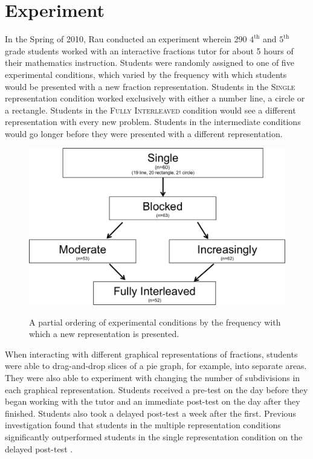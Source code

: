 \documentclass{edm_template}
\newcommand{\mgr}[1]{\textsc{#1}}
\begin{document}
\section{Experiment}
\label{sec:experiment}

In the Spring of 2010, Rau conducted an experiment wherein 290 $4^\text{th}$ and $5^\text{th}$ grade students worked with an interactive fractions tutor for about 5 hours of their mathematics instruction. Students were randomly assigned to one of five experimental conditions, which varied by the frequency with which students would be presented with a new fraction representation. Students in the \mgr{Single} representation condition worked exclusively with either a number line, a circle or a rectangle. Students in the \mgr{Fully Interleaved} condition would see a different representation with every new problem. Students in the intermediate conditions would go longer before they were presented with a different representation.   
\begin{figure}[htbp]
\centering
\includegraphics[scale=.4]{conditionGraph.png}\\
\caption{A partial ordering of experimental conditions by the frequency with which a new representation is presented. }
\label{fig:condition-graph}
\end{figure}

When interacting with different graphical representations of fractions, students were able to drag-and-drop slices of a pie graph, for example, into separate areas. They were also able to experiment with changing the number of subdivisions in each graphical representation. Students received a pre-test on the day before they began working with the tutor and an immediate post-test on the day after they finished. Students also took a delayed post-test a week after the first. Previous investigation found that students in the multiple representation conditions significantly outperformed students in the single representation condition on the delayed post-test \cite{Rau2012}. 
\end{document}
